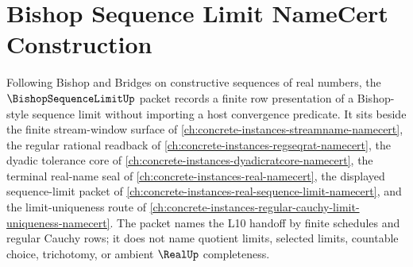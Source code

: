\chapter{Bishop Sequence Limit NameCert Construction}
\label{ch:concrete-instances-bishop-sequence-limit-namecert}

Following Bishop and Bridges on constructive sequences of real numbers, the $\BishopSequenceLimitUp$ packet records a finite row presentation of a Bishop-style sequence limit without importing a host convergence predicate. It sits beside the finite stream-window surface of \autoref{ch:concrete-instances-streamname-namecert}, the regular rational readback of \autoref{ch:concrete-instances-regseqrat-namecert}, the dyadic tolerance core of \autoref{ch:concrete-instances-dyadicratcore-namecert}, the terminal real-name seal of \autoref{ch:concrete-instances-real-namecert}, the displayed sequence-limit packet of \autoref{ch:concrete-instances-real-sequence-limit-namecert}, and the limit-uniqueness route of \autoref{ch:concrete-instances-regular-cauchy-limit-uniqueness-namecert}. The packet names the L10 handoff by finite schedules and regular Cauchy rows; it does not name quotient limits, selected limits, countable choice, trichotomy, or ambient $\RealUp$ completeness.


